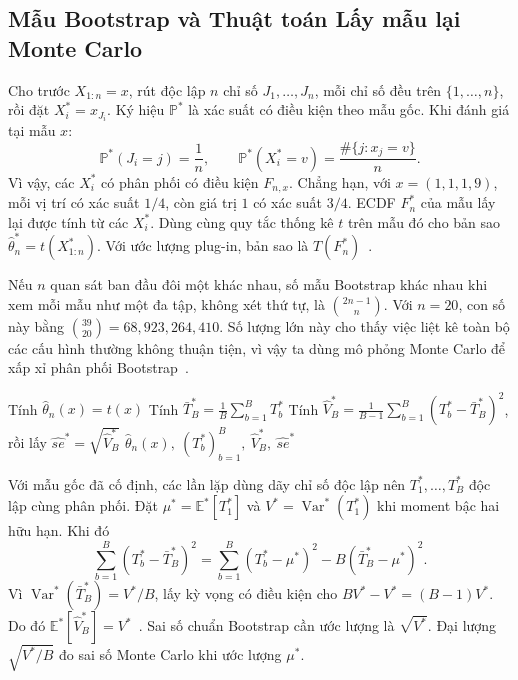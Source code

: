 \documentclass[12pt,a4paper]{article}
\theoremstyle{definition}
\numberwithin{equation}{section}
\begin{document}
	\subsection{Mẫu Bootstrap và Thuật toán Lấy mẫu lại Monte Carlo}

	Cho trước $X_{1:n}=x$, rút độc lập $n$ chỉ số $J_1,\ldots,J_n$,
    mỗi chỉ số đều trên $\{1,\ldots,n\}$, rồi đặt $X_i^*=x_{J_i}$.
    Ký hiệu $\mathbb P^*$ là xác suất có điều kiện theo mẫu gốc.
    Khi đánh giá tại mẫu $x$:
    \[
        \mathbb P^*(J_i=j)=\frac1n,\qquad
        \mathbb P^*(X_i^*=v)=\frac{\#\{j:x_j=v\}}{n}.
    \]
    Vì vậy, các $X_i^*$ có phân phối có điều kiện $F_{n,x}$.
    Chẳng hạn, với $x=(1,1,1,9)$, mỗi vị trí có xác suất $1/4$, còn giá trị
    $1$ có xác suất $3/4$. ECDF $F_n^*$ của mẫu lấy lại được tính từ các
    $X_i^*$. Dùng cùng quy tắc thống kê $t$ trên mẫu đó cho bản sao
    $\hat\theta_n^*=t(X_{1:n}^*)$. Với ước lượng plug-in, bản sao là $T(F_n^*)$~\cite{buithuytrang2026,rizzo2019,efron1993}.

    Nếu $n$ quan sát ban đầu đôi một khác nhau, số mẫu Bootstrap khác
	nhau khi xem mỗi mẫu như một đa tập, không xét thứ tự, là
	$\binom{2n-1}{n}$. Với $n=20$, con số này bằng
	$\binom{39}{20}=68{,}923{,}264{,}410$. Số lượng lớn này cho thấy việc
	liệt kê toàn bộ các cấu hình thường không thuận tiện, vì vậy ta dùng
	mô phỏng Monte Carlo để xấp xỉ phân phối Bootstrap~\cite{rizzo2019,efron1993}.

	\begin{algorithm}[H]
        Tính $\hat\theta_n(x)=t(x)$\;
        Tính $\bar T_B^*=\frac1B\sum_{b=1}^B T_b^*$\;
        Tính $\widehat V_B^*=\frac1{B-1}\sum_{b=1}^B(T_b^*-\bar T_B^*)^2$,
        rồi lấy $\widehat{se}^*=\sqrt{\widehat V_B^*}$\;
        \Return $\hat\theta_n(x),\ (T_b^*)_{b=1}^B,\ \widehat V_B^*,\ \widehat{se}^*$\;
        \caption{Lấy mẫu lại Monte Carlo và ước lượng sai số chuẩn Bootstrap}
        \label{alg:bootstrap-monte-carlo}
    \end{algorithm}

    Với mẫu gốc đã cố định, các lần lặp dùng dãy chỉ số độc lập nên
    $T_1^*,\ldots,T_B^*$ độc lập cùng phân phối.
    Đặt $\mu^*=\mathbb E^*[T_1^*]$ và $V^*=\operatorname{Var}^*(T_1^*)$
    khi moment bậc hai hữu hạn. Khi đó
    \[
        \sum_{b=1}^B(T_b^*-\bar T_B^*)^2
        =\sum_{b=1}^B(T_b^*-\mu^*)^2-B(\bar T_B^*-\mu^*)^2.
    \]
    Vì $\operatorname{Var}^*(\bar T_B^*)=V^*/B$, lấy kỳ vọng có điều kiện
    cho $BV^*-V^*=(B-1)V^*$. Do đó $\mathbb E^*[\widehat V_B^*]=V^*$~\cite[Công thức 8.1, tr.~216]{rizzo2019}.
    Sai số chuẩn Bootstrap cần ước lượng là $\sqrt{V^*}$.
    Đại lượng $\sqrt{V^*/B}$ đo sai số Monte Carlo khi ước lượng $\mu^*$.
\end{document}
